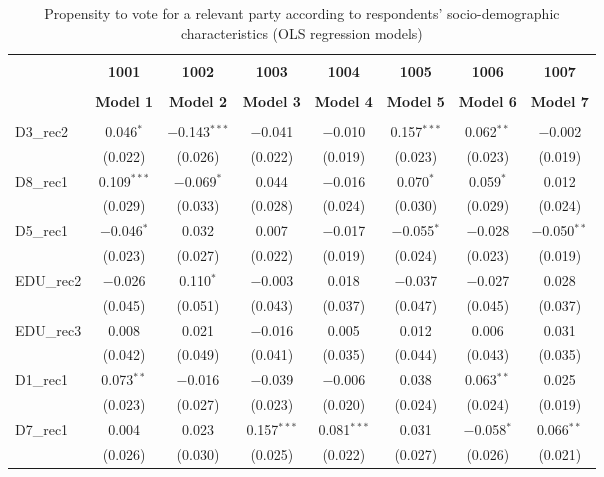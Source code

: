 \documentclass[
]{article}
\begin{document}
\begin{table}[!htbp] \centering 
  \caption{Propensity to vote for a relevant party according to respondents' 
                     socio-demographic characteristics (OLS regression models)} 
  \label{table:full_ols_fi} 
\begin{tabular}{@{\extracolsep{5pt}}lccccccc} 
\\[-1.8ex]\hline \\[-1.8ex] 
 & \textbf{1001} & \textbf{1002} & \textbf{1003} & \textbf{1004} & \textbf{1005} & \textbf{1006} & \textbf{1007} \\ 
\\[-1.8ex] & \textbf{Model 1} & \textbf{Model 2} & \textbf{Model 3} & \textbf{Model 4} & \textbf{Model 5} & \textbf{Model 6} & \textbf{Model 7}\\ 
\hline \\[-1.8ex] 
 D3\_rec2 & 0.046$^{*}$ & $-$0.143$^{***}$ & $-$0.041 & $-$0.010 & 0.157$^{***}$ & 0.062$^{**}$ & $-$0.002 \\ 
  & (0.022) & (0.026) & (0.022) & (0.019) & (0.023) & (0.023) & (0.019) \\ 
  D8\_rec1 & 0.109$^{***}$ & $-$0.069$^{*}$ & 0.044 & $-$0.016 & 0.070$^{*}$ & 0.059$^{*}$ & 0.012 \\ 
  & (0.029) & (0.033) & (0.028) & (0.024) & (0.030) & (0.029) & (0.024) \\ 
  D5\_rec1 & $-$0.046$^{*}$ & 0.032 & 0.007 & $-$0.017 & $-$0.055$^{*}$ & $-$0.028 & $-$0.050$^{**}$ \\ 
  & (0.023) & (0.027) & (0.022) & (0.019) & (0.024) & (0.023) & (0.019) \\ 
  EDU\_rec2 & $-$0.026 & 0.110$^{*}$ & $-$0.003 & 0.018 & $-$0.037 & $-$0.027 & 0.028 \\ 
  & (0.045) & (0.051) & (0.043) & (0.037) & (0.047) & (0.045) & (0.037) \\ 
  EDU\_rec3 & 0.008 & 0.021 & $-$0.016 & 0.005 & 0.012 & 0.006 & 0.031 \\ 
  & (0.042) & (0.049) & (0.041) & (0.035) & (0.044) & (0.043) & (0.035) \\ 
  D1\_rec1 & 0.073$^{**}$ & $-$0.016 & $-$0.039 & $-$0.006 & 0.038 & 0.063$^{**}$ & 0.025 \\ 
  & (0.023) & (0.027) & (0.023) & (0.020) & (0.024) & (0.024) & (0.019) \\ 
  D7\_rec1 & 0.004 & 0.023 & 0.157$^{***}$ & 0.081$^{***}$ & 0.031 & $-$0.058$^{*}$ & 0.066$^{**}$ \\ 
  & (0.026) & (0.030) & (0.025) & (0.022) & (0.027) & (0.026) & (0.021) \\ 

\end{tabular}
\end{table}
\end{document}
